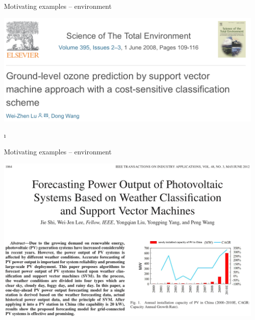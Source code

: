 \documentclass[mathserif, aspectratio=169]{beamer}
\begin{document}
\begin{frame}{Motivating examples -- environment}

\includegraphics[scale=0.6]{lu_etal_OzoneSVM}


\i%





\end{frame}


\begin{frame}{Motivating examples -- environment}


\includegraphics[scale=0.4]{Shi_etal_ForecastingPower}





\end{frame}
\end{document}

